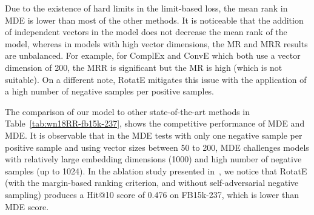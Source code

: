 \documentclass{ecai}
\begin{document}
Due to the existence of hard limits in the limit-based loss, the mean rank in MDE is lower than most of the other methods. It is noticeable that the addition of independent vectors in the model does not decrease the mean rank of the model, whereas in models with high vector dimensions, the MR and MRR results are unbalanced.
For example, for ComplEx and ConvE which both use a vector dimension of 200, the MRR is significant but the MR is high (which is not suitable). On a different note, RotatE mitigates this issue with the application of a high number of negative samples per positive samples.

\begin{table}\centering
{}
    \caption{Results on WN18RR and FB15k-237. Best ones are in bold.}
\label{tab:wn18RR-fb15k-237}
\end{table}


The comparison of our model to other state-of-the-art methods in Table~\ref{tab:wn18RR-fb15k-237}, shows the competitive performance of MDE and MDE.
It is observable that in the MDE tests with only one negative sample per positive sample and using vector sizes between 50 to 200, MDE challenges models with relatively large embedding dimensions (1000) and high number of negative samples (up to 1024). In the ablation study presented in~\cite{sun2019rotate}, we notice that RotatE (with the margin-based ranking criterion, and without self-adversarial negative sampling) produces a Hit@10 score of 0.476 on FB15k-237, which is lower than MDE score.
\end{document}
